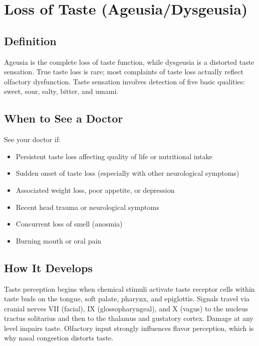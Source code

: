 \chapter{Loss of Taste (Ageusia/Dysgeusia)}

\section*{Definition}
Ageusia is the complete loss of taste function, while dysgeusia is a distorted taste sensation. True taste loss is rare; most complaints of taste loss actually reflect olfactory dysfunction. Taste sensation involves detection of five basic qualities: sweet, sour, salty, bitter, and umami.

\section*{When to See a Doctor}
See your doctor if:
\begin{itemize}
  \item Persistent taste loss affecting quality of life or nutritional intake
  \item Sudden onset of taste loss (especially with other neurological symptoms)
  \item Associated weight loss, poor appetite, or depression
  \item Recent head trauma or neurological symptoms
  \item Concurrent loss of smell (anosmia)
  \item Burning mouth or oral pain
\end{itemize}

\section*{How It Develops}
Taste perception begins when chemical stimuli activate taste receptor cells within taste buds on the tongue, soft palate, pharynx, and epiglottis. Signals travel via cranial nerves VII (facial), IX (glossopharyngeal), and X (vagus) to the nucleus tractus solitarius and then to the thalamus and gustatory cortex. Damage at any level impairs taste. Olfactory input strongly influences flavor perception, which is why nasal congestion distorts taste.

